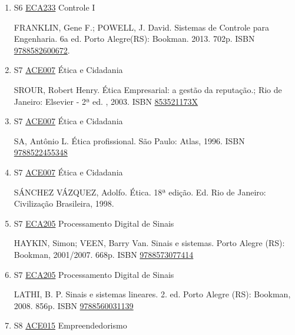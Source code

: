 \documentclass[12pt,a4paper]{book}
\begin{document}
\begin{enumerate}
 
 \item S6 \hyperref[PUD:ECA233]{ECA233} Controle I

 FRANKLIN, Gene F.;  POWELL, J.  David.  Sistemas de Controle para Engenharia.  6a ed.  Porto Alegre(RS): Bookman.  2013.  702p.  ISBN \href{http://www.bn.br/site/pages/servicosProfissionais/agenciaISBN/isbnBusca/FbnBuscaISBNCatalogo.asp?pField=ISBN&pIntPagina=1&pISBN=82600672&nidbISBN=true&hidbISBN=true}{9788582600672}.
 \item S7 \hyperref[PUD:ACE007]{ACE007} Ética e Cidadania

  SROUR, Robert Henry.   Ética Empresarial: a gestão da reputação.;  Rio de Janeiro: Elsevier - 2ª ed. , 2003.  ISBN 
\href{http://www.google.com/search?hl=pt-BR&tbo=p&tbm=bks&q=isbn:853521173X&num=10}{853521173X}
 
 
 \item S7 \hyperref[PUD:ACE007]{ACE007} Ética e Cidadania

  SA, Antônio L.  Ética profissional.  São Paulo: Atlas, 1996.  ISBN \href{http://www.bn.br/site/pages/servicosProfissionais/agenciaISBN/isbnBusca/FbnBuscaISBNCatalogo.asp?pField=ISBN&pIntPagina=1&pISBN=22455348&nidbISBN=true&hidbISBN=true}{9788522455348}
 
 
 \item S7 \hyperref[PUD:ACE007]{ACE007} Ética e Cidadania

  SÁNCHEZ VÁZQUEZ, Adolfo.   Ética.  18ª edição.  Ed.  Rio de Janeiro: Civilização Brasileira, 1998.
 \item S7 \hyperref[PUD:ECA205]{ECA205} Processamento Digital de Sinais

 HAYKIN, Simon;  VEEN, Barry Van.  Sinais e sistemas.  Porto Alegre (RS): Bookman, 2001/2007.  668p.   ISBN \href{http://www.bn.br/site/pages/servicosProfissionais/agenciaISBN/isbnBusca/FbnBuscaISBNCatalogo.asp?pField=ISBN&pIntPagina=1&pISBN=73077414&nidbISBN=true&hidbISBN=true}{9788573077414}
 
 
 \item S7 \hyperref[PUD:ECA205]{ECA205} Processamento Digital de Sinais

 LATHI, B.  P.  Sinais e sistemas lineares.  2. ed.  Porto Alegre (RS): Bookman, 2008.  856p.    ISBN \href{http://www.bn.br/site/pages/servicosProfissionais/agenciaISBN/isbnBusca/FbnBuscaISBNCatalogo.asp?pField=ISBN&pIntPagina=1&pISBN=60031139&nidbISBN=true&hidbISBN=true}{9788560031139}
 
 
 \item S8 \hyperref[PUD:ACE015]{ACE015} Empreendedorismo


\end{enumerate}
\end{document}
